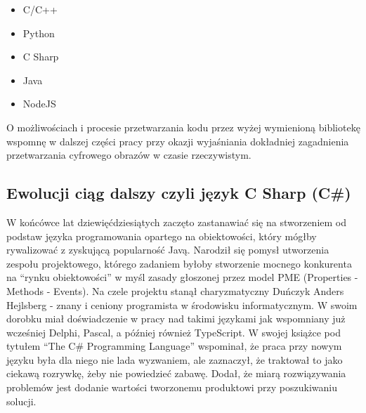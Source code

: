 \documentclass{article}
\begin{document}
\newline
\begin{itemize}
	\item C/C++
	\item Python
	\item C Sharp
	\item Java
	\item NodeJS
\end{itemize}
O możliwościach i procesie przetwarzania kodu przez wyżej wymienioną bibliotekę wspomnę w dalszej części pracy przy okazji wyjaśniania dokładniej zagadnienia przetwarzania cyfrowego obrazów w czasie rzeczywistym.

\subsection{Ewolucji ciąg dalszy czyli język C Sharp (C#)}
W końcówce lat dziewięćdziesiątych zaczęto zastanawiać się na stworzeniem od podstaw języka programowania opartego na obiektowości, który mógłby rywalizować z zyskującą popularność Javą. Narodził się pomysł utworzenia zespołu projektowego, którego zadaniem byłoby stworzenie mocnego konkurenta na “rynku obiektowości” w myśl zasady głoszonej przez model PME (Properties - Methods - Events). Na czele projektu stanął charyzmatyczny Duńczyk Anders Hejlsberg - znany i ceniony programista w środowisku informatycznym. W swoim dorobku miał doświadczenie w pracy nad takimi językami jak wspomniany już wcześniej Delphi, Pascal, a później również TypeScript. W swojej książce pod tytułem “The C\# Programming Language” \cite{ref11} wspominał, że praca przy nowym języku była dla niego nie lada wyzwaniem, ale zaznaczył, że traktował to jako ciekawą rozrywkę, żeby nie powiedzieć zabawę. Dodał, że miarą rozwiązywania problemów jest dodanie wartości tworzonemu produktowi przy poszukiwaniu solucji.
\end{document}
